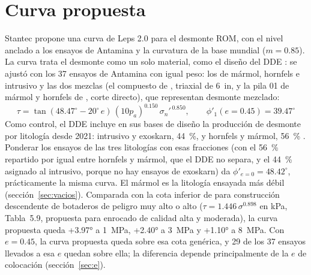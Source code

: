 \documentclass[11pt,letterpaper]{article}
\begin{document}
\section{Curva propuesta}\label{sec:curva}
Stantec propone una curva de Leps 2.0 para el desmonte ROM, con el nivel anclado a los ensayos de Antamina y la curvatura de la base mundial ($m = 0.85$). La curva trata el desmonte como un solo material, como el diseño del DDE \citep[Tabla~3-1]{stantec2026iff}: se ajustó con los 37 ensayos de Antamina con igual peso: los de mármol, hornfels e intrusivo y las dos mezclas (el compuesto de \citealp{g2021}, triaxial de 6~in, y la pila 01 de mármol y hornfels de \citealp{anddes2024}, corte directo), que representan desmonte mezclado:
\begin{equation}
\tau = \tan\!\left(48.47^{\circ} - 20^{\circ}\,e\right)\,(10p_a)^{0.150}\,\sigma_n'^{\,0.850},\qquad \phi'_1(e = 0.45) = 39.47^{\circ}
\end{equation}
Como control, el DDE incluye en sus bases de diseño la producción de desmonte por litología desde 2021: intrusivo y exoskarn, 44~\%, y hornfels y mármol, 56~\% \citep[Tabla~3-1]{stantec2026iff}. Ponderar los ensayos de las tres litologías con esas fracciones (con el 56~\% repartido por igual entre hornfels y mármol, que el DDE no separa, y el 44~\% asignado al intrusivo, porque no hay ensayos de exoskarn) da $\phi'_{e=0} = 48.42^{\circ}$, prácticamente la misma curva. El mármol es la litología ensayada más débil (sección~\ref{sec:vacios}). Comparada con la cota inferior de \citet{hc2017} para construcción descendente de botaderos de peligro muy alto o alto ($\tau = 1.446\,\sigma^{0.898}$ en kPa, Tabla~5.9, propuesta para enrocado de calidad alta y moderada), la curva propuesta queda +3.97° a 1~MPa, +2.40° a 3~MPa y +1.10° a 8~MPa. Con $e = 0.45$, la curva propuesta queda sobre esa cota genérica, y 29 de los 37 ensayos llevados a esa $e$ quedan sobre ella; la diferencia depende principalmente de la $e$ de colocación (sección~\ref{sec:e}).
\end{document}
